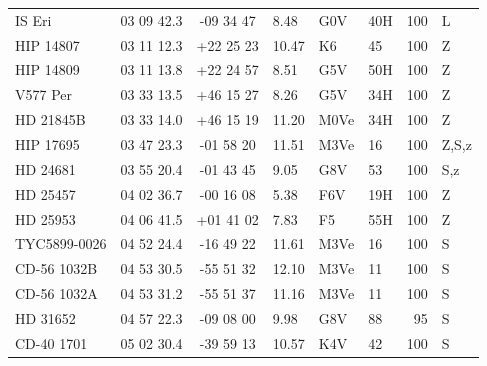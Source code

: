 \documentclass[11pt,twoside]{book}
\begin{document}
\begin{table}[]
{\begin{tabular}{l@{\hskip7pt}ccl
l@{\hskip7pt}lr@{\hskip7pt}l}
IS Eri     &03 09 42.3    &-09 34 47       &\hspace{2mm} 8.48    &G0V   &\hspace{2mm}40H&100 &L\\
HIP 14807  &03 11 12.3    &+22 25 23       &10.47 &       K6   &\hspace{2mm}45&100&Z\\
HIP 14809  &03 11 13.8    &+22 24 57       &\hspace{2mm}8.51     &G5V  &\hspace{2mm}50H& 100&Z\\
V577 Per   &03 33 13.5    &+46 15 27       &\hspace{2mm}8.26     &G5V  &\hspace{2mm}34H& 100&Z\\
HD 21845B  &03 33 14.0    &+46 15 19       &11.20          &M0Ve  &\hspace{2mm}34H& 100&Z\\
HIP 17695  &03 47 23.3    &-01 58 20       &11.51    &M3Ve    &\hspace{2mm}16&100&Z,S,z\\
HD 24681   &03 55 20.4    &-01 43 45       &\hspace{2mm}9.05&G8V&\hspace{2mm}53&100&S,z\\
HD 25457   &04 02 36.7    &-00 16 08       &\hspace{2mm}5.38     &F6V  &\hspace{2mm}19H&100&Z\\
HD 25953   &04 06 41.5    &+01 41 02&       \hspace{2mm}7.83    &F5   &\hspace{2mm}55H& 100&Z\\
TYC5899-0026&04 52 24.4   &-16 49 22&      11.61       &M3Ve          &\hspace{2mm}16& 100&S\\
CD-56 1032B &04 53 30.5   &-55 51 32&      12.10      &M3Ve &\hspace{2mm}11&100&S\\
CD-56 1032A &04 53 31.2   &-55 51 37&     11.16     &M3Ve &\hspace{2mm}11&100&S\\
HD 31652    &04 57 22.3   &-09 08 00&      \hspace{2mm}9.98& G8V&\hspace{2mm}88&95&S\\
CD-40 1701 &05 02 30.4    &-39 59 13&      10.57         &K4V   &\hspace{2mm}42& 100&S\\

\end{tabular}}
\end{table}
\end{document}

